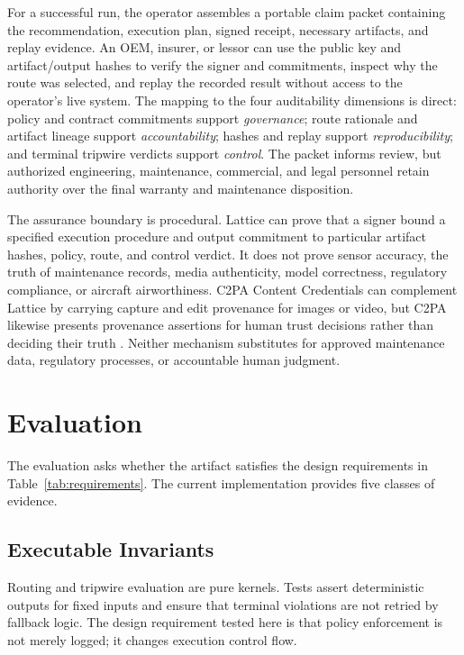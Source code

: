 \documentclass[conference]{IEEEtran}
\begin{document}
For a successful run, the operator assembles a portable claim packet containing
the recommendation, execution plan, signed receipt, necessary artifacts, and
replay evidence. An OEM, insurer, or lessor can use the public key and
artifact/output hashes to verify the signer and commitments, inspect why the
route was selected, and replay the recorded result without access to the
operator's live system. The mapping to the four auditability dimensions is
direct: policy and contract commitments support \emph{governance}; route
rationale and artifact lineage support \emph{accountability}; hashes and replay
support \emph{reproducibility}; and terminal tripwire verdicts support
\emph{control}. The packet informs review, but authorized engineering,
maintenance, commercial, and legal personnel retain authority over the final
warranty and maintenance disposition.

The assurance boundary is procedural. Lattice can prove that a signer bound a
specified execution procedure and output commitment to particular artifact
hashes, policy, route, and control verdict. It does not prove sensor accuracy,
the truth of maintenance records, media authenticity, model correctness,
regulatory compliance, or aircraft airworthiness. C2PA Content Credentials can
complement Lattice by carrying capture and edit provenance for images or video,
but C2PA likewise presents provenance assertions for human trust decisions
rather than deciding their truth \cite{c2pa2026}. Neither mechanism substitutes
for approved maintenance data, regulatory processes, or accountable human
judgment.

\section{Evaluation}

The evaluation asks whether the artifact satisfies the design requirements in
Table~\ref{tab:requirements}. The current implementation provides five classes
of evidence.

\subsection{Executable Invariants}

Routing and tripwire evaluation are pure kernels. Tests assert deterministic
outputs for fixed inputs and ensure that terminal violations are not retried by
fallback logic. The design requirement tested here is that policy enforcement is
not merely logged; it changes execution control flow.
\end{document}
